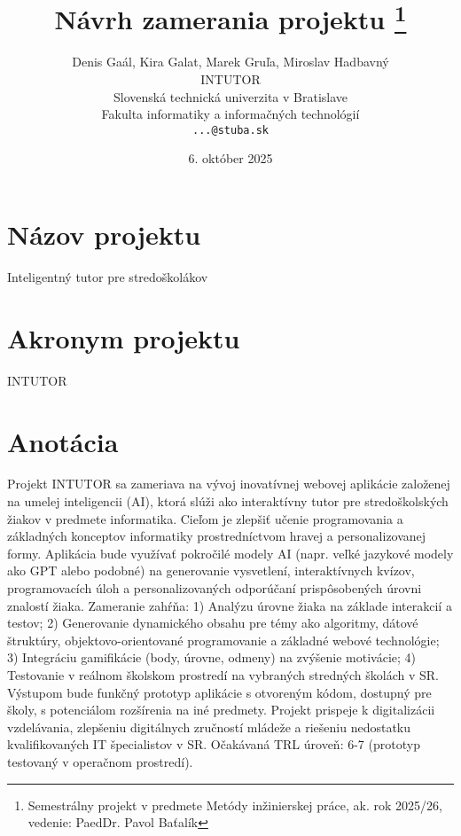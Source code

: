\documentclass[10pt,twoside,slovak,a4paper]{article}
\title{Návrh zamerania projektu
\thanks{Semestrálny projekt v predmete Metódy inžinierskej práce, ak. rok 2025/26, vedenie: PaedDr. Pavol Baťalík}}
\author{Denis Gaál, Kira Galat, Marek Gruľa, Miroslav Hadbavný\\[2pt]
	{\small INTUTOR}\\
	{\small Slovenská technická univerzita v Bratislave}\\
	{\small Fakulta informatiky a informačných technológií}\\
	{\small \texttt{...@stuba.sk}}
	}
\date{\small 6. október 2025} %
\begin{document}
\maketitle

\section{Názov projektu}
Inteligentný tutor pre stredoškolákov

\section{Akronym projektu}
INTUTOR

\section{Anotácia}
Projekt INTUTOR sa zameriava na vývoj inovatívnej webovej aplikácie založenej na umelej inteligencii (AI), ktorá slúži ako interaktívny tutor pre stredoškolských žiakov v predmete informatika. Cieľom je zlepšiť učenie programovania a základných konceptov informatiky prostredníctvom hravej a personalizovanej formy. Aplikácia bude využívať pokročilé modely AI (napr. veľké jazykové modely ako GPT alebo podobné) na generovanie vysvetlení, interaktívnych kvízov, programovacích úloh a personalizovaných odporúčaní prispôsobených úrovni znalostí žiaka. Zameranie zahŕňa: 1) Analýzu úrovne žiaka na základe interakcií a testov; 2) Generovanie dynamického obsahu pre témy ako algoritmy, dátové štruktúry, objektovo-orientované programovanie a základné webové technológie; 3) Integráciu gamifikácie (body, úrovne, odmeny) na zvýšenie motivácie; 4) Testovanie v reálnom školskom prostredí na vybraných stredných školách v SR. Výstupom bude funkčný prototyp aplikácie s otvoreným kódom, dostupný pre školy, s potenciálom rozšírenia na iné predmety. Projekt prispeje k digitalizácii vzdelávania, zlepšeniu digitálnych zručností mládeže a riešeniu nedostatku kvalifikovaných IT špecialistov v SR. Očakávaná TRL úroveň: 6-7 (prototyp testovaný v operačnom prostredí).
\end{document}
